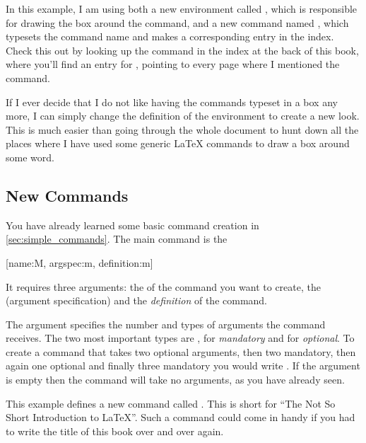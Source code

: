 \begin{example}
\begin{lscommand}
\end{lscommand}
\end{example}

In this example, I am using both a new environment called
, which is responsible for drawing the box around the
command, and a new command named , which typesets the command
name and makes a corresponding entry in the index. Check
this out by looking up the  command in the index at the back
of this book, where you'll find an entry for , pointing to
every page where I mentioned the  command.

If I ever decide that I do not like having the commands typeset in
a box any more, I can simply change the definition of the
 environment to create a new look. This is much
easier than going through the whole document to hunt down all the
places where I have used some generic \LaTeX{} commands to draw a
box around some word.

\subsection{New Commands}\label{sec:new_commands}

You have already learned some basic command creation in
\autoref{sec:simple_commands}. The main command is the
\begin{lscommand}
  [name:M, argspec:m, definition:m]
\end{lscommand}
It requires three arguments: the  of the command you want to create,
the  (argument specification) and the \emph{definition} of the
command.

The  argument specifies the number and types of arguments the
command receives. The two most important types are , for
\emph{mandatory} and  for \emph{optional}. To create a command that
takes two optional arguments, then two mandatory, then again one optional and
finally three mandatory you would write . If the 
argument is empty then the command will take no arguments, as you have already
seen.

This example defines a new command called . This is
short for \enquote{The Not So Short Introduction to \LaTeX}. Such a command
could come in handy if you had to write the title of this book over
and over again.

